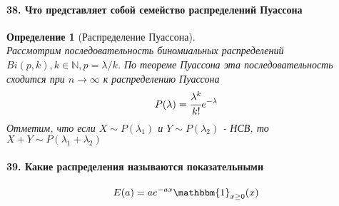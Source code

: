 \documentclass[titlepage]{article}
\newcommand{\N}{\mathbb{N}} %
\newtheorem{definition}{Определение}
\begin{document}
\paragraph{38. Что представляет собой семейство распределений Пуассона}
\begin{definition}[Распределение Пуассона] ~\\
	Рассмотрим последовательность биномиальных распределений $Bi(p,k),k \in \N, p = \lambda/k$. По теореме Пуассона эта последовательность сходится при $n\rightarrow\infty$ к распределению Пуассона
	\[P(\lambda) = \cfrac{\lambda^k}{k!}e^{-\lambda}\]
	Отметим, что если $X \sim P(\lambda_1)$ и $Y \sim P(\lambda_2)$ - НСВ, то $X + Y \sim P(\lambda_1 + \lambda_2)$
\end{definition}

\paragraph{39. Какие распределения называются показательными}
\[E(a) = ae^{-ax}\mathbbm{1}_{x\geq0}(x)\]
\end{document}

